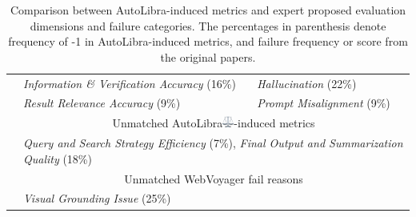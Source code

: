 \begin{table}[!t]
\begin{tabular}{@{}lp{}p{}@{}}
		                                                                                                  & \cellcolor{hall}\textit{Information \& Verification Accuracy} (16\%)                                                                                                                                                                          & \cellcolor{hall}\textit{Hallucination} (22\%)                             \\
		                                                                                                  & \cellcolor{misalign}\textit{Result Relevance Accuracy} (9\%)                                                                                                                                                                                  & \cellcolor{misalign}\textit{Prompt Misalignment} (9\%)                    \\
		\cmidrule(lr){2-3}                                                                                & \multicolumn{2}{c}{Unmatched AutoLibra\protect\includegraphics[height=1em]{figs/scale.png}-induced metrics}                                                                                                                                    \\
		\cmidrule(lr){2-3}                                                                                & \multicolumn{2}{C{0.93\textwidth}}{\cellcolor{unmatched}\textit{Query and Search Strategy Efficiency} (7\%), \textit{Final Output and Summarization Quality} (18\%)}                                                                           \\
		\cmidrule(lr){2-3}                                                                                & \multicolumn{2}{c}{Unmatched WebVoyager fail reasons}                                                                                                                                                                                          \\
		\cmidrule(lr){2-3}                                                                                & \multicolumn{2}{C{0.93\textwidth}}{\cellcolor{unmatched}\textit{Visual Grounding Issue} (25\%)}                                                                                                                                                \\
		\bottomrule
	\end{tabular}
	\caption{Comparison between AutoLibra-induced metrics and expert proposed
	evaluation dimensions and failure categories. The percentages in parenthesis denote
	frequency of -1 in AutoLibra-induced metrics, and failure frequency or score from
	the original papers.}
	\label{tab:merged_comparison}
	\vspace{-20pt}
\end{table}

